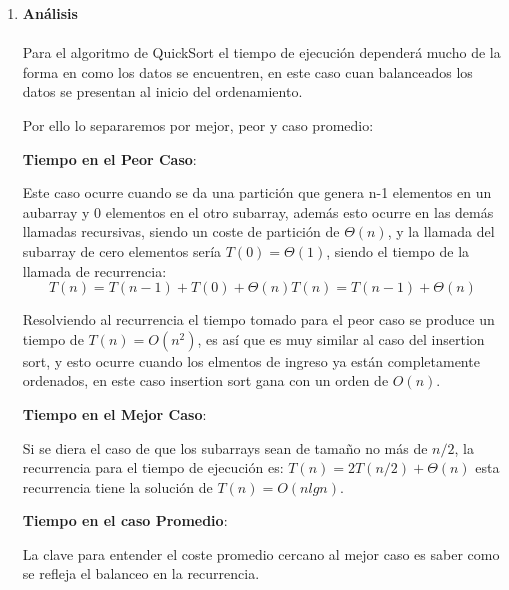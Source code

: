 \documentclass{article}
\begin{document}
                    \begin{enumerate}
                        \item \textbf{An\'{a}lisis}\\
                            \\
                            Para el algoritmo de QuickSort el tiempo de ejecuci\'{o}n depender\'{a} mucho de la forma en como los datos se encuentren, en este caso cuan balanceados los datos se presentan al inicio del ordenamiento.
                            
                            Por ello lo separaremos por mejor, peor y caso promedio:
                            
                            \textbf{Tiempo en el Peor Caso}:
                            
                            Este caso ocurre cuando se da una partici\'{o}n que genera n-1 elementos en un aubarray y 0 elementos en el otro subarray, adem\'{a}s esto ocurre en las dem\'{a}s llamadas recursivas, siendo un coste de partici\'{o}n de $\Theta(n) $, y la llamada del subarray de cero elementos ser\'{i}a $T(0) =  \Theta(1)$, siendo el tiempo de la llamada de recurrencia:
                            $$
                            T(n) = T(n-1) + T(0) + \Theta(n)
                            T(n) = T(n-1) + \Theta(n)
                            $$
                            
                            Resolviendo al recurrencia el tiempo tomado para el peor caso se produce un tiempo de $T(n) = O(n^2)$, es as\'{i} que es muy similar al caso del insertion sort, y esto ocurre cuando los elmentos de ingreso ya est\'{a}n completamente ordenados, en este caso insertion sort gana con un orden de $O(n)$.
                            
                            \textbf{Tiempo en el Mejor Caso}:
                            
                            Si se diera el caso de que los subarrays sean de tama\~{n}o no m\'{a}s de $n/2$, la recurrencia para el tiempo de ejecuci\'{o}n es: $T(n) = 2T(n/2) + \Theta(n)$ esta recurrencia tiene la soluci\'{o}n de $T(n) = O(nlgn)$.
                            
                            \textbf{Tiempo en el caso Promedio}:
                            
                            La clave para entender el coste promedio cercano al mejor caso es saber como se refleja el balanceo en la recurrencia.
                            

\end{enumerate}
\end{document}
